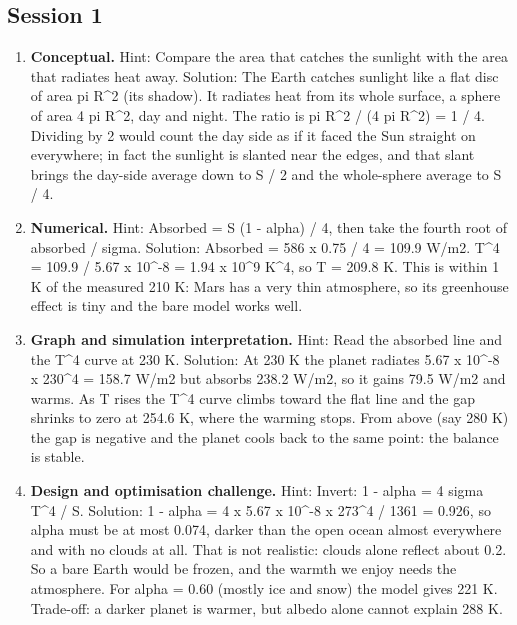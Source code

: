 \documentclass[11pt,a4paper]{article}
\begin{document}
\subsection*{Session 1}
\begin{enumerate}[nosep]
\item \textbf{Conceptual.} Hint: Compare the area that catches the sunlight with the area that radiates heat away. Solution: The Earth catches sunlight like a flat disc of area pi R\textasciicircum{}2 (its shadow). It radiates heat from its whole surface, a sphere of area 4 pi R\textasciicircum{}2, day and night. The ratio is pi R\textasciicircum{}2 / (4 pi R\textasciicircum{}2) = 1 / 4. Dividing by 2 would count the day side as if it faced the Sun straight on everywhere; in fact the sunlight is slanted near the edges, and that slant brings the day-side average down to S / 2 and the whole-sphere average to S / 4.
\item \textbf{Numerical.} Hint: Absorbed = S (1 - alpha) / 4, then take the fourth root of absorbed / sigma. Solution: Absorbed = 586 x 0.75 / 4 = 109.9 W/m2. T\textasciicircum{}4 = 109.9 / 5.67 x 10\textasciicircum{}-8 = 1.94 x 10\textasciicircum{}9 K\textasciicircum{}4, so T = 209.8 K. This is within 1 K of the measured 210 K: Mars has a very thin atmosphere, so its greenhouse effect is tiny and the bare model works well.
\item \textbf{Graph and simulation interpretation.} Hint: Read the absorbed line and the T\textasciicircum{}4 curve at 230 K. Solution: At 230 K the planet radiates 5.67 x 10\textasciicircum{}-8 x 230\textasciicircum{}4 = 158.7 W/m2 but absorbs 238.2 W/m2, so it gains 79.5 W/m2 and warms. As T rises the T\textasciicircum{}4 curve climbs toward the flat line and the gap shrinks to zero at 254.6 K, where the warming stops. From above (say 280 K) the gap is negative and the planet cools back to the same point: the balance is stable.
\item \textbf{Design and optimisation challenge.} Hint: Invert: 1 - alpha = 4 sigma T\textasciicircum{}4 / S. Solution: 1 - alpha = 4 x 5.67 x 10\textasciicircum{}-8 x 273\textasciicircum{}4 / 1361 = 0.926, so alpha must be at most 0.074, darker than the open ocean almost everywhere and with no clouds at all. That is not realistic: clouds alone reflect about 0.2. So a bare Earth would be frozen, and the warmth we enjoy needs the atmosphere. For alpha = 0.60 (mostly ice and snow) the model gives 221 K. Trade-off: a darker planet is warmer, but albedo alone cannot explain 288 K.
\end{enumerate}
\end{document}
